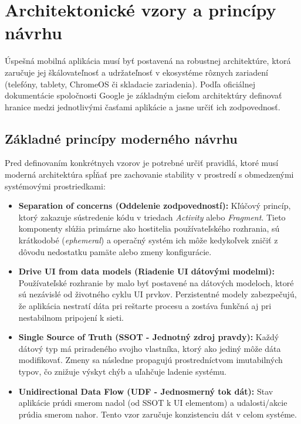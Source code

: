 \section{Architektonické vzory a princípy návrhu}
Úspešná mobilná aplikácia musí byť postavená na robustnej architektúre, ktorá zaručuje jej škálovateľnosť a udržateľnosť v ekosystéme rôznych zariadení (telefóny, tablety, ChromeOS či skladacie zariadenia). Podľa oficiálnej dokumentácie spoločnosti Google je základným cieľom architektúry definovať hranice medzi jednotlivými časťami aplikácie a jasne určiť ich zodpovednosť.

\subsection{Základné princípy moderného návrhu}
Pred definovaním konkrétnych vzorov je potrebné určiť pravidlá, ktoré musí moderná architektúra spĺňať pre zachovanie stability v prostredí s obmedzenými systémovými prostriedkami:

\begin{itemize}
    \item \textbf{Separation of concerns (Oddelenie zodpovedností):} Kľúčový princíp, ktorý zakazuje sústredenie kódu v triedach \textit{Activity} alebo \textit{Fragment}. Tieto komponenty slúžia primárne ako hostitelia používateľského rozhrania, sú krátkodobé (\textit{ephemeral}) a operačný systém ich môže kedykoľvek zničiť z dôvodu nedostatku pamäte alebo zmeny konfigurácie.
    \item \textbf{Drive UI from data models (Riadenie UI dátovými modelmi):} Používateľské rozhranie by malo byť postavené na dátových modeloch, ktoré sú nezávislé od životného cyklu UI prvkov. Perzistentné modely zabezpečujú, že aplikácia nestratí dáta pri reštarte procesu a zostáva funkčná aj pri nestabilnom pripojení k sieti.
    \item \textbf{Single Source of Truth (SSOT - Jednotný zdroj pravdy):} Každý dátový typ má priradeného svojho vlastníka, ktorý ako jediný môže dáta modifikovať. Zmeny sa následne propagujú prostredníctvom imutabilných typov, čo znižuje výskyt chýb a uľahčuje ladenie systému.
    \item \textbf{Unidirectional Data Flow (UDF - Jednosmerný tok dát):} Stav aplikácie prúdi smerom nadol (od SSOT k UI elementom) a udalosti/akcie prúdia smerom nahor. Tento vzor zaručuje konzistenciu dát v celom systéme.
\end{itemize}



